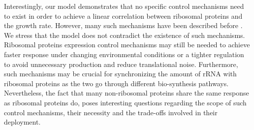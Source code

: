 Interestingly, our model demonstrates that no specific control mechanisms need to exist in order to achieve a linear correlation between ribosomal proteins and the growth rate.
However, many such mechanisms have been described before \cite{Nomura1984}.
We stress that the model does not contradict the existence of such mechanisms.
Ribosomal proteins expression control mechanisms may still be needed to achieve faster response under changing environmental conditions or a tighter regulation to avoid unnecessary production and reduce translational noise.
Furthermore, such mechanisms may be crucial for synchronizing the amount of rRNA with ribosomal proteins as the two go through different bio-synthesis pathways.
Nevertheless, the fact that many non-ribosomal proteins share the same response as ribosomal proteins do, poses interesting questions regarding the scope of such control mechanisms, their necessity and the trade-offs involved in their deployment.